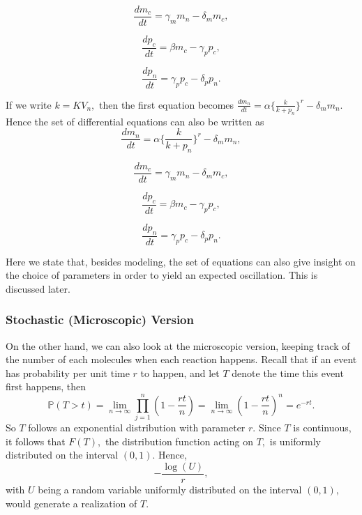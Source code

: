 \documentclass[12pt]{article}
\renewcommand{\(}{\left (}
\renewcommand{\)}{\right )}
\begin{document}
\begin{equation}
	\frac{dm_c}{dt} = \gamma_m m_n - \delta_m m_c,
\end{equation}

\begin{equation}
	\frac{dp_c}{dt} = \beta m_c - \gamma_p p_c,
\end{equation}

\begin{equation}
	\frac{dp_n}{dt} = \gamma_p p_c - \delta_p p_n.
\end{equation}

If we write $k = K V_n,$ then the first equation becomes $\frac{dm_n}{dt} = \alpha \{\frac{k}{k + p_n}\}^r - \delta_m m_n.$ Hence the set of differential equations can also be written as
\begin{equation}
	\frac{dm_n}{dt} = \alpha \{\frac{k}{k + p_n}\}^r - \delta_m m_n,
\end{equation}

\begin{equation}
	\frac{dm_c}{dt} = \gamma_m m_n - \delta_m m_c,
\end{equation}

\begin{equation}
	\frac{dp_c}{dt} = \beta m_c - \gamma_p p_c,
\end{equation}

\begin{equation}
	\frac{dp_n}{dt} = \gamma_p p_c - \delta_p p_n.
\end{equation}

Here we state that, besides modeling, the set of equations can also give insight on the choice of parameters in order to yield an expected oscillation. This is discussed later.


\subsubsection{Stochastic (Microscopic) Version}
\hspace{5mm} On the other hand, we can also look at the microscopic version, keeping track of the number of each molecules when each reaction happens. Recall that if an event has probability per unit time $r$ to happen, and let $T$ denote the time this event first happens, then
\begin{equation}
	\mathbb{P}(T > t) = \lim_{n \to \infty} \prod_{j=1}^{n} (1-\frac{rt}{n}) = \lim_{n \to \infty} (1 - \frac{rt}{n})^n = e^{-rt}.
\end{equation}
So $T$ follows an exponential distribution with parameter $r.$  Since $T$ is continuous, it follows that $F(T),$ the distribution function acting on $T,$ is uniformly distributed on the interval $(0,1).$ Hence, $$-\frac{\log(U)}{r},$$ with $U$ being a random variable uniformly distributed on the interval $(0,1),$ would generate a realization of $T.$
\end{document}
